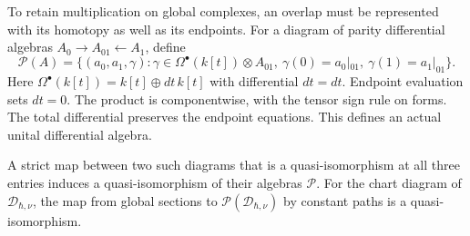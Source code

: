 To retain multiplication on global complexes, an overlap must be represented with its homotopy as well as its endpoints.
For a diagram of parity differential algebras $A_0\to A_{01}\leftarrow A_1$, define
\[
 \mathcal P(A)=
 \{(a_0,a_1,\gamma):
 \gamma\in\Omega^\bullet(k[t])\otimes A_{01},\
 \gamma(0)=a_0|_{01},\ \gamma(1)=a_1|_{01}\}.
\]
Here $\Omega^\bullet(k[t])=k[t]\oplus dt\,k[t]$ with differential $d t=dt$.
Endpoint evaluation sets $dt=0$.
The product is componentwise, with the tensor sign rule on forms.
The total differential preserves the endpoint equations.
This defines an actual unital differential algebra.

\begin{lemma}\label{lem:qc-global-paths}
A strict map between two such diagrams that is a quasi-isomorphism at all three entries induces a quasi-isomorphism of their algebras $\mathcal P$.
For the chart diagram of $\mathcal D_{\hbar,\nu}$, the map from global sections to $\mathcal P(\mathcal D_{\hbar,\nu})$ by constant paths is a quasi-isomorphism.
\end{lemma}
